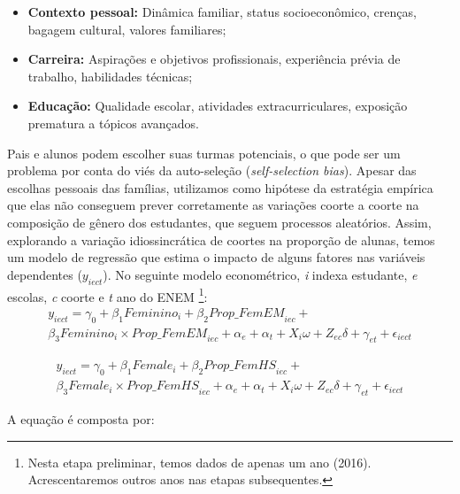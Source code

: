 \begin{itemize}
  \item \textbf{Contexto pessoal:} Dinâmica familiar, status socioeconômico, crenças, bagagem cultural, valores familiares;
  \item \textbf{Carreira:} Aspirações e objetivos profissionais, experiência prévia de trabalho, habilidades técnicas; 
  \item \textbf{Educação:} Qualidade escolar, atividades extracurriculares, exposição prematura a tópicos avançados. 
\end{itemize}

Pais e alunos podem escolher suas turmas potenciais, o que pode ser um problema por conta do viés da auto-seleção (\textit{self-selection bias}). Apesar das escolhas pessoais das famílias, utilizamos como hipótese da estratégia empírica que elas não conseguem prever corretamente as variações coorte a coorte na composição de gênero dos estudantes, que seguem processos aleatórios. Assim, explorando a variação idiossincrática de coortes na proporção de alunas, temos um modelo de regressão que estima o impacto de alguns fatores nas variáveis dependentes ($y_{iect}$). No seguinte modelo econométrico, \textit{i} indexa estudante, \textit{e} escolas, \textit{c} coorte e \textit{t} ano do ENEM \footnote{Nesta etapa preliminar, temos dados de apenas um ano (2016). Acrescentaremos outros anos nas etapas subsequentes.}:
\begin{gather*}
y_{iect} = \gamma_0 + \beta_1 \textit{Feminino}_i + \beta_2 \textit{Prop\_FemEM}_{iec} + \\ \beta_3 \textit{Feminino}_i \times \textit{Prop\_FemEM}_{iec} + \alpha_e + \alpha_t + X_i \omega + Z_{ec} \delta + \gamma_{et} + \epsilon_{iect}
\end{gather*}

\begin{gather*}
  y_{iect} = \gamma_0 + \beta_1 \textit{Female}_i + \beta_2 \textit{Prop\_FemHS}_{iec} + \\ \beta_3 \textit{Female}_i \times \textit{Prop\_FemHS}_{iec} + \alpha_e + \alpha_t + X_i \omega + Z_{ec} \delta + \gamma_{et} + \epsilon_{iect}
  \end{gather*}

A equação é composta por:


